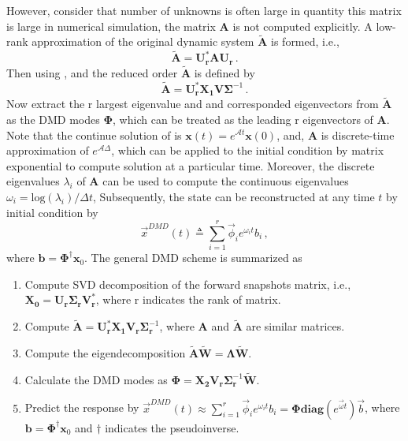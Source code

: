 However, consider that number of unknowns is often large in quantity this matrix is large in numerical simulation, the matrix $\mathbf{A}$ is not computed explicitly.
A low-rank approximation of the original dynamic system $\mathbf{\tilde{A}}$ is formed, i.e.,
\begin{equation}
\label{eq:reduced_dmd_1}
\mathbf{\tilde{A}} =  \mathbf{U_r^* A U_r} \, .
\end{equation}
Then using , and the reduced order $\mathbf{\tilde{A}}$ is defined by
\begin{equation}
\label{eq:reduced_dmd_2}
\mathbf{\tilde{A}} =  \mathbf{U_r^*} \mathbf{X_1} \mathbf{V} \bm{\Sigma}^{-1} \, .
\end{equation}
Now extract the r largest eigenvalue and and corresponded eigenvectors from $\mathbf{\tilde{A}}$ as the DMD modes $\boldsymbol{\Phi}$, which can be treated as the leading r eigenvectors of $\mathbf{A}$.
Note that the continue solution of  is $\mathbf{x}(t) = e^{\mathcal{A}t}\mathbf{x}(0)$, and, $\mathbf{A}$ is discrete-time approximation of $e^{\mathcal{A}\Delta}$, which can be applied to the initial condition by matrix exponential to compute solution at a particular time. 
Moreover, the discrete eigenvalues $\lambda_i$ of $\mathbf{A}$ can be used to compute the continuous eigenvalues $\omega_i= \text{log}(\lambda_i)/\Delta t$, Subsequently, the state can be reconstructed at any time $t$ by initial condition by  
\begin{equation}
\label{eq:dmd_predict}
\vec{x}^{DMD}(t) \triangleq \sum_{i=1}^{r} \vec{\phi}_i e^{\omega_it} b_i \, ,
\end{equation}
where $\mathbf{b}=\boldsymbol{\Phi}^{\dag} \mathbf{x}_{0}$. 
The general DMD scheme is summarized as

\begin{enumerate}
\item Compute SVD decomposition of the forward snapshots matrix, i.e., $ \mathbf{X_0} = \mathbf{U_r} \boldsymbol{\Sigma_r} \mathbf{V_r^{*}}$, where r indicates the rank of matrix.
\item Compute $\mathbf{\tilde{A}}=\mathbf{U_r^{*}X_1}\mathbf{V_r}\boldsymbol{\Sigma}_{\mathbf{r}}^{-1}$, where $\mathbf{A}$ and $\mathbf{\tilde{A}}$ are similar matrices.
\item Compute the eigendecomposition $\mathbf{\tilde{A} \tilde{W}}=\boldsymbol{\Lambda}\mathbf{\tilde{W}}$.
\item Calculate the DMD modes as ${\boldsymbol{\Phi}}={\mathbf{X_2V_r}}\boldsymbol{\Sigma}_\mathbf{r}^{-1}{\mathbf{\tilde{W}}}$.
\item Predict the response by $\vec{x}^{DMD}(t) \approx \sum_{i=1}^{r} \vec{\phi}_i e^{\omega_it} b_i = \boldsymbol{\Phi}{\mathbf{diag}}(e^{\vec{\omega}t})\vec{b}$, where $\mathbf{b}=\boldsymbol{\Phi}^{\dag} \mathbf{x}_{0}$ and $\dagger$ indicates the pseudoinverse.
\end{enumerate}

